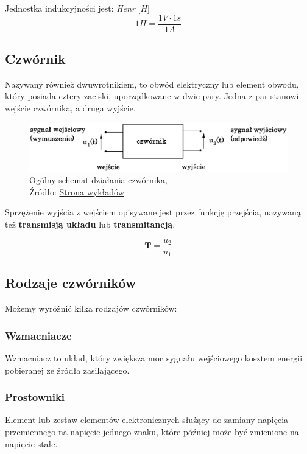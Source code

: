 \documentclass{article}
\begin{document}
        Jednostka indukcyjności jest: \textit{Henr} [$H$]
        \begin{equation}
          1 H = \frac{1 V \cdot 1 s}{1 A}
        \end{equation}

    \subsection{Czwórnik}
      Nazywany również dwuwrotnikiem, to obwód elektryczny lub element obwodu, który posiada cztery zaciski, uporządkowane w dwie pary. Jedna z par stanowi wejście czwórnika, a druga wyjście.

      \begin{figure}[!ht]
            \centering
            \includegraphics[scale=0.5]{grafiki/Czwornik.eps}
            \caption{Ogólny schemat działania czwórnika,
            \\Źródło: \href{https://spe.if.uj.edu.pl/literatura}{Strona wykładów}}
      \end{figure}

      Sprzężenie wyjścia z wejściem opisywane jest przez funkcję przejścia, nazywaną też \textbf{transmisją układu} lub \textbf{transmitancją}.

      \begin{equation}
        \textbf{T}  = \frac{u_2}{u_1}
        \label{eq2:transmisja}
      \end{equation}

    \subsection{Rodzaje czwórników}
      Możemy wyróżnić kilka rodzajów czwórników:
      \subsubsection{Wzmacniacze}
        Wzmacniacz to układ, który zwiększa moc sygnału wejściowego kosztem energii pobieranej ze źródła zasilającego.
      \subsubsection{Prostowniki}
        Element lub zestaw elementów elektronicznych służący do zamiany napięcia przemiennego na napięcie jednego znaku, które później może być zmienione na napięcie stałe.
\end{document}
